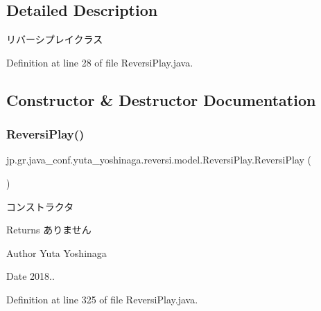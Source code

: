 \subsection{Detailed Description}
リバーシプレイクラス 

Definition at line 28 of file Reversi\+Play.\+java.



\subsection{Constructor \& Destructor Documentation}
\mbox{\label{classjp_1_1gr_1_1java__conf_1_1yuta__yoshinaga_1_1reversi_1_1model_1_1_reversi_play_a8244dde6e8abc75432834de7ccb4f52c}} 
\subsubsection{\texorpdfstring{Reversi\+Play()}{ReversiPlay()}}
{\footnotesize\ttfamily jp.\+gr.\+java\+\_\+conf.\+yuta\+\_\+yoshinaga.\+reversi.\+model.\+Reversi\+Play.\+Reversi\+Play (\begin{DoxyParamCaption}{ }\end{DoxyParamCaption})}



コンストラクタ 

\begin{DoxyReturn}{Returns}
ありません 
\end{DoxyReturn}
\begin{DoxyAuthor}{Author}
Yuta Yoshinaga 
\end{DoxyAuthor}
\begin{DoxyDate}{Date}
2018.. 
\end{DoxyDate}


Definition at line 325 of file Reversi\+Play.\+java.




